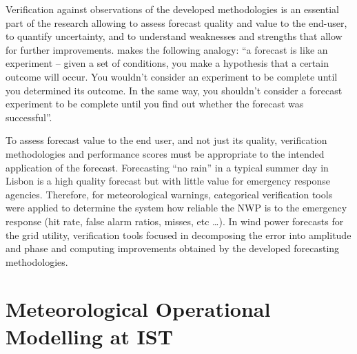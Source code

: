 Verification against observations of the developed methodologies is an essential part of the research allowing to assess forecast quality and value to the end-user, to quantify uncertainty, and to understand weaknesses and strengths that allow for further improvements. \cite{VerifFAQ} makes the following analogy: ``a forecast is like an experiment -- given a set of conditions, you make a hypothesis that a certain outcome will occur. You wouldn't consider an experiment to be complete until you determined its outcome. In the same way, you shouldn't consider a forecast experiment to be complete until you find out whether the forecast was successful''.

To assess forecast value to the end user, and not just its quality, verification methodologies and performance scores must be appropriate to the intended application of the forecast. Forecasting ``no rain'' in a typical summer day in Lisbon is a high quality forecast but with little value for emergency response agencies. Therefore, for meteorological warnings, categorical verification tools were applied to determine the system how reliable the NWP is to the emergency response (hit rate, false alarm ratios, misses, etc \ldots). In wind power forecasts for the grid utility, verification tools focused in decomposing the error into amplitude and phase and computing improvements obtained by the developed forecasting methodologies. 



\section{Meteorological Operational Modelling at IST}


